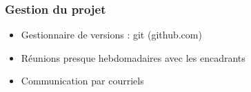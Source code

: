 
\begin{frame}
	\frametitle{Gestion du projet}
	\begin{itemize}
		\item Gestionnaire de versions : git (github.com)
		\item Réunions presque hebdomadaires avec les encadrants
		\item Communication par courriels
	\end{itemize}
\end{frame}


